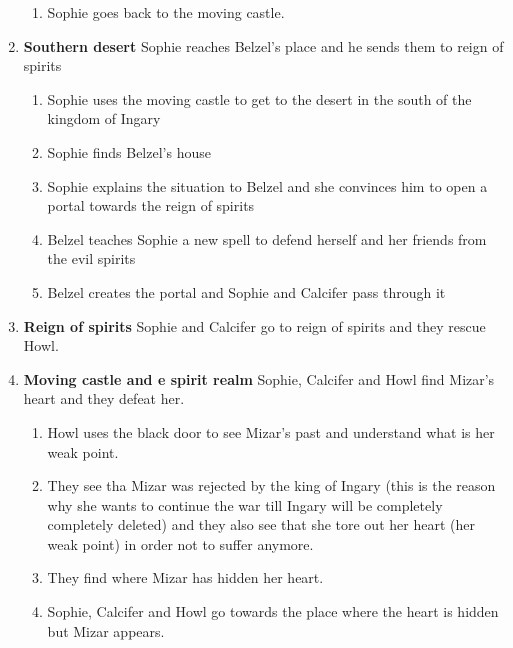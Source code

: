 \begin{enumerate}
\begin{enumerate}
  \item Sophie goes back to the moving castle.
  \end{enumerate}

\item \textbf{Southern desert} Sophie reaches Belzel’s place and he sends them to reign of spirits

  \begin{enumerate}
  \item Sophie uses the moving castle to get to the desert in the south of the kingdom of Ingary
    
  \item Sophie finds Belzel’s house
    
  \item Sophie explains the situation to Belzel and she convinces him to open a portal towards the reign of spirits
    
  \item Belzel teaches Sophie a new spell to defend herself and her friends from the evil spirits
    
  \item Belzel creates the portal and Sophie and Calcifer pass through it
  \end{enumerate}

\item \textbf{Reign of spirits} Sophie and Calcifer go to reign of spirits and they rescue Howl.

\item \textbf{Moving castle and e spirit realm}  Sophie, Calcifer and Howl find Mizar’s heart and they defeat her.

  \begin{enumerate}
  \item Howl uses the black door to see Mizar’s past and understand what is her weak point.
    
  \item They see tha Mizar was rejected by the king of Ingary (this is the reason why she wants to continue the war till Ingary will be completely completely deleted) and they also see that she tore out her heart (her weak point) in order not to suffer anymore.
    
  \item They find where Mizar has hidden her heart.
    
  \item Sophie, Calcifer and Howl go towards the place where the heart is hidden but Mizar appears.
    

\end{enumerate}
\end{enumerate}
